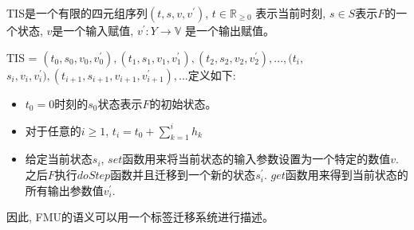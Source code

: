 TIS是一个有限的四元组序列$(t,s,v,v^{\prime})$, $t \in \mathbb{R}_{\geqslant{0}}$ 表示当前时刻, $s \in S$表示$F$的一个状态, $v$是一个输入赋值, $v^{\prime} : Y \rightarrow \mathbb{V}$ 是一个输出赋值。
 
TIS = $(t_{0},s_{0},v_{0},v_{0}^{\prime}), (t_{1},s_{1},v_{1},v_{1}^{\prime}),(t_{2},s_{2},v_{2},v_{2}^{\prime}), ..., (t_{i},$
$s_{i},v_{i},v_{i}^{\prime}), (t_{i+1},s_{i+1},v_{i+1},v_{i+1}^{\prime}), ...$定义如下:
\begin{itemize}
\item
$t_{0} = 0$时刻的$s_{0}$状态表示$F$的初始状态。
\item
对于任意的$i \geqslant 1$, $t_{i} = t_{0} + \sum_{k = 1}^i h_{k}$
\item
给定当前状态$s_{i}$, $set$函数用来将当前状态的输入参数设置为一个特定的数值$v$. 之后$F$执行$doStep$函数并且迁移到一个新的状态$s_{i}^{\prime}$.  $get$函数用来得到当前状态的所有输出参数值$v_{i}^{\prime}$.
\end{itemize}
因此, FMU的语义可以用一个标签迁移系统进行描述。

